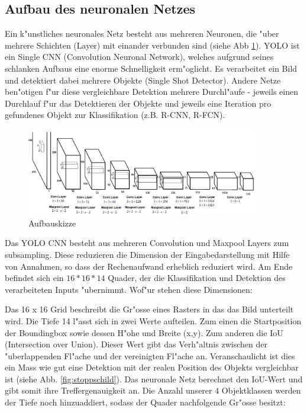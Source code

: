 \subsection{Aufbau des neuronalen Netzes}
\label{sec:cnn_aufbau}
Ein k"unstliches neuronales Netz besteht aus mehreren Neuronen, die "uber mehrere Schichten (Layer) mit einander verbunden sind (siehe Abb \ref{fig:neunet}). YOLO ist ein Single CNN (Convolution Neuronal Network), welches aufgrund seines schlanken Aufbaus eine enorme Schnelligkeit erm"oglicht. Es verarbeitet ein Bild und detektiert dabei mehrere Objekte (Single Shot Detector). Andere Netze ben"otigen f"ur diese vergleichbare Detektion mehrere Durchl"aufe - jeweils einen Durchlauf f"ur das Detektieren der Objekte und jeweils eine Iteration pro gefundenes Objekt zur Klassifikation (z.B. R-CNN, R-FCN).

\begin{figure}[h]
	\centering
	\includegraphics[width=0.90\textwidth]{images/aufbauskizze}
	\caption{Aufbauskizze \cite{CNN}}
	\label{fig:neunet}
\end{figure}

Das YOLO CNN besteht aus mehreren Convolution und Maxpool Layers zum subsampling. Diese reduzieren die Dimension der Eingabedarstellung mit Hilfe von Annahmen, so dass der Rechenaufwand erheblich reduziert wird. Am Ende befindet sich ein $16*16*14$ Quader, der die Klassifikation und Detektion des verarbeiteten Inputs "ubernimmt. Wof"ur stehen diese Dimensionen:

Das 16 x 16 Grid beschreibt die Gr"osse eines Rasters in das das Bild unterteilt wird. Die Tiefe 14 l"asst sich in zwei Werte aufteilen. Zum einen die Startposition der Boundingbox sowie dessen H"ohe und Breite (x,y).  Zum anderen die IoU (Intersection over Union). Dieser Wert gibt das Verh"altnis zwischen der "uberlappenden Fl"ache und der vereinigten Fl"ache an. Veranschaulicht ist dies ein Mass wie gut eine Detektion mit der realen Position des Objekts vergleichbar ist (siehe Abb. \ref{fig:stoppschild}). Das neuronale Netz berechnet den IoU-Wert und gibt somit ihre Treffergenauigkeit an. Die Anzahl unserer 4 Objektklassen werden der Tiefe noch hinzuaddiert, sodass der Quader nachfolgende Gr"osse besitzt:
	
